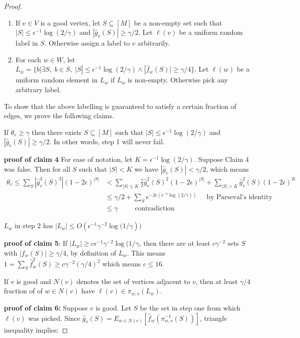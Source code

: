 \documentclass{article}
\newcommand{\1}{\mathbbm{1}}
\begin{document}
\begin{proof}
\begin{enumerate}[1)]
    \item If $v\in V$ is a good vertex, let $S\subseteq [M]$ be a non-empty set such that $|S|\leq \epsilon^{-1}\log(2/\gamma)$ and $|\hat{g}_v(S)|\geq \gamma/2$. Let $\ell(v)$ be a uniform random label in $S$. Otherwise assign a label to $v$ arbitrarily.
    \item For each $w\in W$, let $L_w=\{b| \exists S,\; b\in S,\; |S|\leq \epsilon^{-1}\log(2/\gamma)\wedge |\hat{f}_w(S)|\geq \gamma/4\}$. Let $\ell(w)$ be a uniform random element in $L_w$ if $L_w$ is non-empty. Otherwise pick any arbitrary label.
\end{enumerate}
To show that the above labelling is guaranteed to satisfy a certain fraction of edges, we prove the following claims.
\begin{claim}
If $\theta_v \geq \gamma$ then there exists $S\subseteq [M]$ such that $|S|\leq \epsilon^{-1}\log{(2/\gamma)}$ and $|\hat{g}_v(S)| \geq \gamma/2$. In other words, step 1 will never fail.
\end{claim}
\textbf{proof of claim 4} For ease of notation, let $K = \epsilon^{-1}\log{(2/\gamma)}$. Suppose Claim 4 was false. Then for all $S$ such that $|S| < K$ we have $|\hat{g}_v(S)| < \gamma/2$, which means
\begin{align*}
    \theta_v \leq \sum_{S}|\hat{g}_v^3(S)^3|(1-2\epsilon)^{|S|}&< \sum_{|S|\leq K}\frac{\gamma}{2}\hat{g}_v^2(S)^2(1-2\epsilon)^{|S|} + \sum_{|S| > K}\hat{g}_v^2(S)(1-2\epsilon)^{K}\\
    &\leq \gamma/2 + \sum_{S}e^{-2\epsilon(\epsilon^{-1}\log{(2/\gamma)})}\;\;\;\;\;\text{by Parseval's identity}\\
    &\leq \gamma\;\;\;\;\;\;\;\;\;\text{contradiction}
\end{align*}
\begin{claim} $L_w$ in step 2 has $|L_w|\leq O(\epsilon^{-1}\gamma^{-2}\log{(1/\gamma}))$
\end{claim}
\textbf{proof of claim 5}: If $|L_w|\geq c\epsilon^{-1}\gamma^{-2}\log{(1/\gamma}$, then there are at least $c\gamma^{-2}$ sets $S$ with $|f_w(S)|\geq \gamma/4$, by definition of $L_w$. This means $1 = \sum_S\hat{f}_w^2(S)\geq c\gamma^{-2}(\gamma/4)^2$ which means $c\leq 16$.
\begin{claim}
If $v$ is good and $N(v)$ denotes the set of vertices adjacent to $v$, then at least $\gamma/4$ fraction of of $w\in N(v)$ have $\ell(v)\in \pi_{w,v}(L_w)$.
\end{claim}
\textbf{proof of claim 6:} Suppose $v$ is good. Let $S$
 be the set in step one from which $\ell(v)$ was picked. Since $\hat{g}_v(S) = E_{w\in N(v)}[\hat{f}_w(\pi_{w,v}^{-1}(S))]$, triangle inequality implies:

\end{proof}
\end{document}
